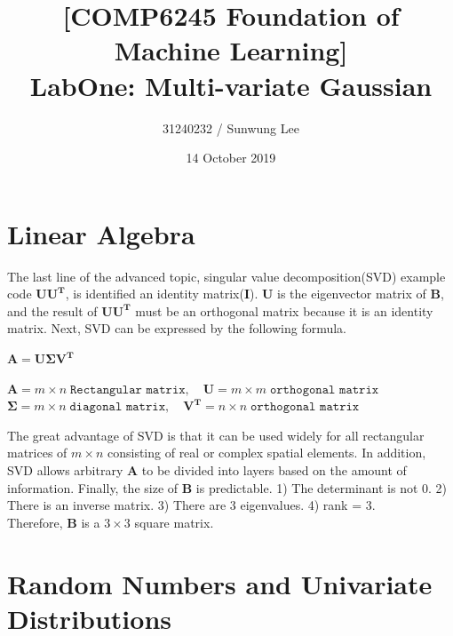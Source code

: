 \documentclass[letterpaper, 11pt]{article}
\title{[COMP6245 Foundation of Machine Learning] \\ LabOne: Multi-variate Gaussian}
\author{31240232 / Sunwung Lee}
\affil{MSc Artificial Intelligence, University of Southampton}
\date{14 October 2019}
\renewcommand{\vec}[1]{\boldsymbol{\mathbf{#1}}}
\newcommand{\mat}[1]{\vec{#1}}
\begin{document}
\maketitle
\section{Linear Algebra}

The last line of the advanced topic, singular value decomposition(SVD) example code $\mat{U}\mat{U^T}$, is identified an identity matrix($\mat{I}$). $\mat{U}$ is the eigenvector matrix of $\mat{B}$, and the result of $\mat{U}\mat{U^T}$ must be an orthogonal matrix because it is an identity matrix. 
Next, SVD can be expressed by the following formula.

\begin{center}
    
$\mat{A}=\mat{U}\mat{\Sigma}\mat{V^T}$

$\mat{A} = m\times n \; \texttt{Rectangular matrix}, \quad  \mat{U} = m\times m \; \texttt{orthogonal matrix}$ \\
$\mat{\Sigma} = m\times n \; \texttt{diagonal matrix}, \quad \mat{V^T} = n\times n \; \texttt{orthogonal matrix}$

\end{center}
The great advantage of SVD is that it can be used widely for all rectangular matrices of $m\times n$ consisting of real or complex spatial elements. In addition, SVD allows arbitrary $\mat{A}$ to be divided into layers based on the amount of information.
Finally, the size of $\mat{B}$ is predictable. 1) The determinant is not 0. 2) There is an inverse matrix. 3) There are 3 eigenvalues. 4) rank = 3.\\
Therefore, $\mat{B}$ is a $3\times 3$ square matrix.

\section{Random Numbers and Univariate Distributions}
\end{document}

